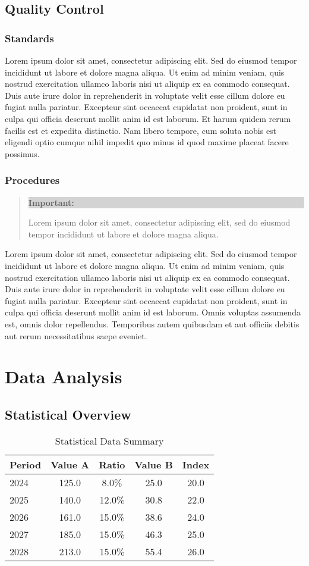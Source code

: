 \documentclass[11pt,a4paper]{article}
\newcommand{\loremtext}[1]{%
  Lorem ipsum dolor sit amet, consectetur adipiscing elit. Sed do eiusmod tempor incididunt ut labore et dolore magna aliqua. Ut enim ad minim veniam, quis nostrud exercitation ullamco laboris nisi ut aliquip ex ea commodo consequat. Duis aute irure dolor in reprehenderit in voluptate velit esse cillum dolore eu fugiat nulla pariatur. Excepteur sint occaecat cupidatat non proident, sunt in culpa qui officia deserunt mollit anim id est laborum.%
}
\newenvironment{highlight}%
{\begin{quote}\colorbox{lightgray}{\parbox{\dimexpr\linewidth-2\fboxsep}{\textbf{Important:} }}}%
{\end{quote}}
\begin{document}
\subsection{Quality Control}

\subsubsection{Standards}
\loremtext{10} Et harum quidem rerum facilis est et expedita distinctio. Nam libero tempore, cum soluta nobis est eligendi optio cumque nihil impedit quo minus id quod maxime placeat facere possimus.

\subsubsection{Procedures}
\begin{highlight}
Lorem ipsum dolor sit amet, consectetur adipiscing elit, sed do eiusmod tempor incididunt ut labore et dolore magna aliqua.
\end{highlight}

\loremtext{11} Omnis voluptas assumenda est, omnis dolor repellendus. Temporibus autem quibusdam et aut officiis debitis aut rerum necessitatibus saepe eveniet.

\section{Data Analysis}

\subsection{Statistical Overview}

\begin{table}[h]
\centering
\begin{tabular}{|l|c|c|c|c|}
\hline
\textbf{Period} & \textbf{Value A} & \textbf{Ratio} & \textbf{Value B} & \textbf{Index} \\
\hline
2024 & 125.0 & 8.0\% & 25.0 & 20.0 \\
\hline
2025 & 140.0 & 12.0\% & 30.8 & 22.0 \\
\hline
2026 & 161.0 & 15.0\% & 38.6 & 24.0 \\
\hline
2027 & 185.0 & 15.0\% & 46.3 & 25.0 \\
\hline
2028 & 213.0 & 15.0\% & 55.4 & 26.0 \\
\hline
\end{tabular}
\caption{Statistical Data Summary}
\end{table}
\end{document}
